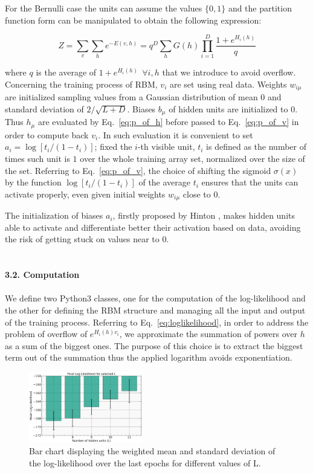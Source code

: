 \documentclass[prl,twocolumn]{revtex4-1}
\begin{document}
For the Bernulli case the units can assume the values $\{0,1\}$ and the partition function form can be manipulated to obtain the following expression:

\begin{equation}
	Z=\sum_v\sum_h{e^{-E(v,h)}}=q^D\sum_h{G(h)\prod_{i=1}^D{\frac{1+e^{H_i(h)}}{q}}}
	\label{eq:Z_function_bernulli}
\end{equation}

where $q$ is the average of $1+e^{H_i(h)}\ \ \forall{i,h}$ that we introduce to avoid overflow. Concerning the training process of RBM, $v_i$ are set using real data. Weights $w_{i\mu}$ are initialized sampling values from a Gaussian distribution of mean $0$ and standard deviation of $2/\sqrt{L+D}$. Biases $b_\mu$ of hidden units are initialized to $0$. Thus $h_\mu$ are evaluated by Eq.~\ref{eq:p_of_h} before passed to Eq.~\ref{eq:p_of_v} in order to compute back $v_i$. In such evaluation it is convenient to set $a_i=\log[t_i/(1-t_i)]$; fixed the $i$-th visible unit, $t_i$ is defined as the number of times such unit is $1$ over the whole training array set, normalized over the size of the set. Referring to Eq.~\ref{eq:p_of_v}, the choice of shifting the sigmoid $\sigma(x)$ by the function $\log[t_i/(1-t_i)]$ of the average $t_i$ ensures that the units can activate properly, even given initial weights $w_{i\mu}$ close to $0$.

The initialization of biases $a_i$, firstly proposed by Hinton \cite{pap2}, makes hidden units able to activate and differentiate better their activation based on data, avoiding the risk of getting stuck on values near to $0$.
\\
\\
\\
\noindent\textbf{3.2. Computation}
\\
\\
We define two Python3 classes, one for the computation of the log-likelihood and the other for defining the RBM structure and managing all the input and output of the training process. Referring to Eq.~\ref{eq:loglikelihood}, in order to address the problem of overflow of $e^{H_i(h)v_i}$, we approximate the summation of powers over $h$ as a sum of the biggest ones. The purpose of this choice is to extract the biggest term out of the summation thus the applied logarithm avoids exponentiation.

\begin{figure}[!tb]
	\includegraphics[width=0.44\textwidth]{L_of_L.jpg}
	\caption{Bar chart displaying the weighted mean and standard deviation of the log-likelihood over the last epochs for different values of L.}
	\label{fig:L_of_L}
\end{figure}
\end{document}
